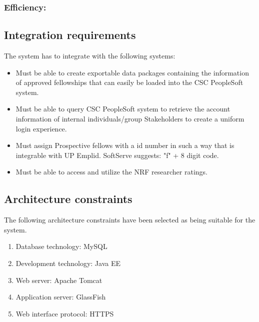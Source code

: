 \documentclass[12pt]{article}
\begin{document}
\subsubsection{Efficiency:} %

\begin{flushleft}



\end{flushleft}

\vspace{0.1in}


\subsection{Integration requirements} %
\vspace{0.2in}
The system has to integrate with the following systems:
\begin{itemize}
\item Must be able to create exportable data packages containing the information of approved fellowships that can easily be loaded into the CSC PeopleSoft system.
\item Must be able to query CSC PeopleSoft system to retrieve the account information of internal individuals/group Stakeholders to create a uniform login experience.
\item Must assign Prospective fellows with a id number in such a way that is integrable with UP Emplid. SoftServe suggests: "f" + 8 digit code.
\item Must be able to access and utilize the NRF researcher ratings.
\end{itemize}
\vspace{0.2in}

\subsection{Architecture constraints} %
\vspace{0.2in}
The following architecture constraints have been selected as being suitable for the system.
\begin{enumerate}
\item Database technology: MySQL
\item Development technology: Java EE
\item Web server: Apache Tomcat
\item Application server: GlassFish
\item Web interface protocol: HTTPS
\end{enumerate}
\vspace{0.5in}
\end{document}
